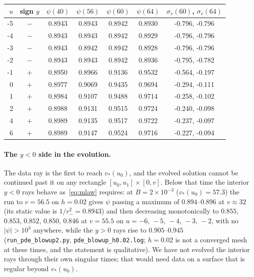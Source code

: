 \documentclass[11pt]{article}
\begin{document}
\begin{center}\small
\begin{tabular}{rcccccc}
\toprule
$u$ & sign $y$ & $\psi(40)$ & $\psi(56)$ & $\psi(60)$ & $\psi(64)$ & $\sigma_v(60)$, $\sigma_v(64)$\\\midrule
-5 & $-$ & 0.8943 & 0.8943 & 0.8942 & 0.8930 & -0.796, -0.796\\
-4 & $-$ & 0.8943 & 0.8943 & 0.8942 & 0.8929 & -0.796, -0.796\\
-3 & $-$ & 0.8943 & 0.8942 & 0.8942 & 0.8928 & -0.796, -0.796\\
-2 & $-$ & 0.8943 & 0.8943 & 0.8942 & 0.8936 & -0.795, -0.782\\
-1 & $+$ & 0.8950 & 0.8966 & 0.9136 & 0.9532 & -0.564, -0.197\\
0 & $+$ & 0.8977 & 0.9069 & 0.9435 & 0.9694 & -0.294, -0.111\\
1 & $+$ & 0.8984 & 0.9107 & 0.9488 & 0.9714 & -0.258, -0.102\\
2 & $+$ & 0.8988 & 0.9131 & 0.9515 & 0.9724 & -0.240, -0.098\\
4 & $+$ & 0.8989 & 0.9135 & 0.9517 & 0.9722 & -0.237, -0.097\\
6 & $+$ & 0.8989 & 0.9147 & 0.9524 & 0.9716 & -0.227, -0.094\\
\bottomrule
\end{tabular}
\end{center}


\paragraph{The $y<0$ side in the evolution.} The data ray is the first to reach $v_*(u_0)$, and the evolved solution cannot be continued past it on any rectangle $[u_0,u_1]\times[0,v]$. Below that time the interior $y<0$ rays behave as~\eqref{eq:mlaw} requires: at $B=2\times10^{-3}$ ($v_*(u_0)=57.3$) the run to $v=56.5$ on $h=0.02$ gives $\psi$ passing a maximum of $0.894$--$0.896$ at $v\approx32$ (its static value is $1/r_-^{2}=0.8943$) and then decreasing monotonically to $0.855$, $0.853$, $0.852$, $0.850$, $0.846$ at $v=55.5$ on $u=-6,\,-5,\,-4,\,-3,\,-2$, with no $|\psi|>10^{3}$ anywhere, while the $y>0$ rays rise to $0.905$--$0.945$ (\texttt{run\_pde\_blowup2.py}, \texttt{pde\_blowup\_h0.02.log}; $h=0.02$ is not a converged mesh at these times, and the statement is qualitative). We have not evolved the interior rays through their own singular times; that would need data on a surface that is regular beyond $v_*(u_0)$.
\end{document}
